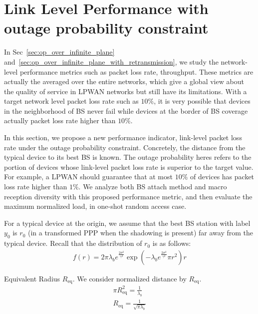 \section{Link Level Performance with outage probability constraint}
In Sec~\ref{sec:op_over_infinite_plane} and~\ref{sec:op_over_infinite_plane_with_retransmission}, we study the network-level performance metrics such as packet loss rate, throughput. These metrics are actually the averaged over the entire networks, which give a global view about the quality of service in LPWAN networks but still have its limitations. With a target network level packet loss rate such as $10\%$, it is very possible that devices in the neighborhood of BS never fail while devices at the border of BS coverage actually packet loss rate higher than $10\%$.

In this section, we propose a new performance indicator, link-level packet loss rate under the outage probability constraint. Concretely, the distance from the typical device to its best BS is known. The outage probability heres refers to the portion of devices whose link-level packet loss rate is superior to the target value. For example, a LPWAN should guarantee that at most $10\%$ of devices has packet loss rate higher than $1\%$.  We analyze both BS attach method and macro reception diversity with this proposed performance metric, and then evaluate the maximum normalized load, in one-shot random access case.

For a typical device at the origin, we assume that the best BS station with label $y_0$ is $r_{0}$ (in a transformed PPP when the shadowing is present) far away from the typical device. Recall that the distribution of $r_0$ is as follows:
\begin{align}
\label{eq:pdf_modified_r_0}
f(r) = 2 \pi \lambda_b e^{\frac{2\sigma^2}{\gamma^2}}  \exp( -\lambda_b  e^{\frac{2\sigma^2}{\gamma^2}} \pi r^2 ) r 
\end{align}







Equivalent Radius $R_{\text{eq}}$. We consider normalized distance by $R_{\text{eq}}$.
\begin{align}
	\pi R_{\text{eq}} ^ 2 = \frac{1}{\lambda_{b}} \\
	 R_{\text{eq}}  = \frac{1}{\sqrt{\pi \lambda_{b}}}
\end{align}
